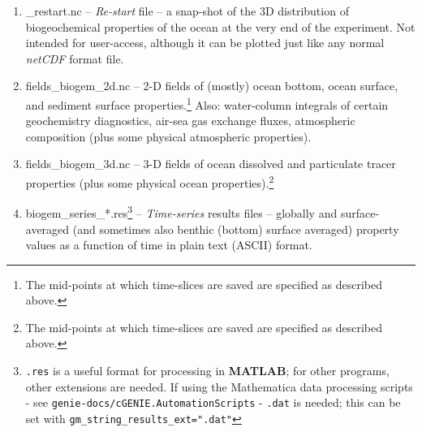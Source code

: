 \documentclass[11pt,fleqn]{book} %
\begin{document}
\begin{enumerate}

\vspace{1mm}\item \textsf{\footnotesize *\_restart.nc} -- \textit{Re-start} file -- a snap-shot of the 3D distribution of biogeochemical properties of the ocean at the very end of the experiment. Not intended for user-access, although it can be plotted just like any normal \textit{netCDF} format file.

\vspace{1mm}\item \textsf{\footnotesize fields\_biogem\_2d.nc} -- 2-D fields of (mostly) ocean bottom, ocean surface, and sediment surface properties.\footnote{The mid-points at which time-slices are saved are specified as described above.} Also: water-column integrals of certain geochemistry diagnostics, air-sea gas exchange fluxes, atmospheric composition (plus some physical atmospheric properties).

\vspace{1mm}\item \textsf{\footnotesize fields\_biogem\_3d.nc} -- 3-D fields of ocean dissolved and particulate tracer properties (plus some physical ocean properties).\footnote{The mid-points at which time-slices are saved are specified as described above.}

\vspace{1mm}\item \textsf{\footnotesize biogem\_series\_*.res}\footnote{\texttt{.res} is a useful format for processing in \textbf{MATLAB}; for other programs, other extensions are needed. If using the Mathematica data processing scripts - see \texttt{genie-docs/cGENIE.AutomationScripts} - \texttt{.dat} is needed; this can be set with  \texttt{gm\_string\_results\_ext=".dat"}} -- \textit{Time-series} results files -- globally and surface-averaged (and sometimes also benthic (bottom) surface averaged) property values as a function of time in plain text (ASCII) format.


\end{enumerate}
\end{document}
